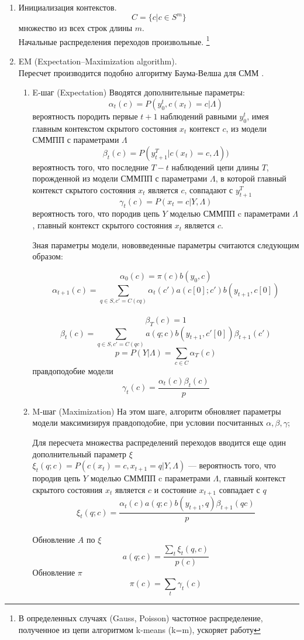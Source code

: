 \documentclass{matmex-diploma-custom}
\begin{document}
\begin{enumerate}
\item Инициализация контекстов.
$$ C = \{c| c\in S^{m}\}$$
множество из всех строк длины $m$.
\\
Начальные распределения переходов произвольные.
\footnote{В определенных случаях (Gauss, Poisson) частотное распределение, полученное из цепи алгоритмом k-means (k=m), ускоряет работу}
\\
\item EM (Expectation–Maximization algorithm).
\\
Пересчет производится подобно алгоритму Баума-Велша для СММ \cite{Rabiner1989}.
\\
\begin{enumerate}
\item E-шаг (Expectation)
Вводятся дополнительные параметры:
$$ \alpha_{t}(c) = P(y_{0}^{t}, c(x_{t})=c| \Lambda)$$
вероятность породить первые $t+1$ наблюдений равными $y_{0}^{t}$, имея главным контекстом  скрытого состояния $x_{t}$ контекст $ c $, из модели СММПП с параметрами $\Lambda$
\\
$$ \beta_{t}(c) = P(y_{t+1}^{T}| c(x_{t})=c, \Lambda))$$
вероятность того, что последние $T-t$ наблюдений цепи длины $T$, порожденной из модели СММПП с параметрами $\Lambda$, в которой главный контекст скрытого состояния $x_{t}$ является $ c $, совпадают с $y_{t+1}^{T}$
\\
$$ \gamma_{t}(c) = P(x_{t}=c|Y,\Lambda) $$ 
вероятность того, что породив цепь $Y$ моделью СММПП c параметрами $\Lambda$,
главный контекст скрытого состояния $ x_{t} $ является $c$. 

Зная параметры модели, нововведенные параметры считаются следующим образом:
\begin{center}
$$ \alpha_{0}(c) = \pi(c)b(y_{0},c)$$ 
$$ \alpha_{t+1}(c) = \sum_{q \in S, c'=C(cq)}{\alpha_{t}(c')a(c[0];c')b(y_{t+1},c[0])}$$
\\
$$ \beta_{T}(c) = 1$$ 
$$ \beta_{t}(c) = \sum_{q \in S, c'=C(qc)}{a(q;c)b(y_{t+1}, c'[0])\beta_{t+1}(c')}$$
$$p = P(Y|\Lambda) = \sum_{c \in C}\alpha_{T}(c)$$
правдоподобие модели
\\ 
$$ \gamma_{t}(c) = \frac{\alpha_{t}(c)\beta_{t}(c)}{p}$$
\end{center}
\item M-шаг (Maximization)
На этом шаге, алгоритм обновляет параметры модели максимизируя правдоподобие, при условии посчитанных $\alpha, \beta, \gamma$;

Для пересчета множества распределений переходов вводится еще один дополнительный параметр $\xi$\\
$ \xi_{t}(q;c) = P(c(x_{t})=c, x_{t+1} = q| Y, \Lambda)$ ---
вероятность того, что породив цепь $Y$ моделью СММПП c параметрами $\Lambda$, 
главный контекст скрытого состояния $ x_{t} $ является $c$ и состояние $ x_{t+1} $ совпадает с $q$
$$ \xi_{t}(q;c) = \frac{\alpha_{t}(c)a(q;c)b(y_{t+1},q)\beta_{t+1}(qc)}{p} $$
\\
Обновление $ A $ по $ \xi $\\
$$ a(q; c) = \frac{\sum_{t}\xi_{t}(q,c)}{p(c)}$$
Обновление $\pi$
$$\pi(c) = \sum_{t}\gamma_{t}(c)$$


\end{enumerate}
\end{enumerate}
\end{document}
